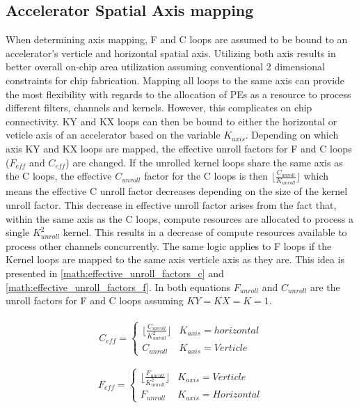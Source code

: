 \subsection{Accelerator Spatial Axis mapping}
\label{chap:dda:dataflow_dse:indirect_mode:axis_mapping}

When determining axis mapping, F and C loops are assumed to be bound to an
accelerator's verticle and horizontal spatial axis. Utilizing both axis results
in better overall on-chip area utilization assuming conventional 2 dimensional
constraints for chip fabrication. Mapping all loops to the same axis can provide
the most flexibility with regards to the allocation of PEs as a resource to
process different filters, channels and kernels. However, this complicates on
chip connectivity. KY and KX loops can then be
bound to either the horizontal or veticle axis of an accelerator based on the
variable $K_{axis}$.  Depending on which axis KY and KX loops are mapped, the
effective unroll factors for F and C loops ($F_{eff}$ and $C_{eff}$) are
changed. If the unrolled kernel loops share the same axis as the C loops, the
effective $C_{unroll}$ factor for the C loops is then $\lfloor
\frac{C_{unroll}}{K_{unroll}} \rfloor$ which means the effective C unroll factor
decreases depending on the size of the kernel unroll factor. This decrease in
effective unroll factor arises from the fact that, within the same axis as the C
loops, compute resources are allocated to process a single $K^2_{unroll}$ kernel. This
results in a decrease of compute resources available to process other channels
concurrently. The same logic applies to F loops if the Kernel loops are mapped
to the same axis verticle axis as they are. This idea is presented in
\autoref{math:effective_unroll_factors_c} and
\autoref{math:effective_unroll_factors_f}. In both equations $F_{unroll}$ and
$C_{unroll}$ are the unroll factors for F and C loops assuming $KY=KX=K=1$.


\begin{align}
    \begin{gathered}
        C_{eff} = \begin{cases} \lfloor \frac{C_{unroll}}{K^{2}_{unroll}} \rfloor & K_{axis} = horizontal\\ C_{unroll} & K_{axis} = Verticle\end{cases} \\
        \end{gathered}
    \label{math:effective_unroll_factors_c}
\end{align}
\begin{align}
    \begin{gathered}
        F_{eff} = \begin{cases} \lfloor \frac{F_{unroll}}{K^{2}_{unroll}} \rfloor & K_{axis} = Verticle\\ F_{unroll} & K_{axis} = Horizontal\end{cases} \\
        \end{gathered}
    \label{math:effective_unroll_factors_f}
\end{align}

